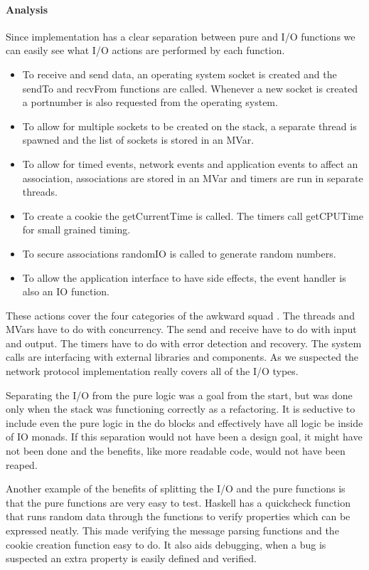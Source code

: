 \paragraph{Analysis}
Since implementation has a clear separation between pure and I/O functions we can easily see what I/O actions are performed by each function. 

\begin{itemize}
\item To receive and send data, an operating system socket is created and the sendTo and recvFrom functions are called. Whenever a new socket is created a portnumber is also requested from the operating system.
\item To allow for multiple sockets to be created on the stack, a separate thread is spawned and the list of sockets is stored in an MVar.
\item To allow for timed events, network events and application events to affect an association, associations are stored in an MVar and timers are run in separate threads.
\item To create a cookie the getCurrentTime is called. The timers call getCPUTime for small grained timing.
\item To secure associations randomIO is called to generate random numbers.
\item To allow the application interface to have side effects, the event handler is also an IO function.
\end{itemize}

These actions cover the four categories of the awkward squad \cite{jones_tackling_2009}. The threads and MVars have to do with concurrency. The send and receive have to do with input and output. The timers have to do with error detection and recovery. The system calls are interfacing with external libraries and components. As we suspected the network protocol implementation really covers all of the I/O types.

Separating the I/O from the pure logic was a goal from the start, but was done only when the stack was functioning correctly as a refactoring. It is seductive to include even the pure logic in the do blocks and effectively have all logic be inside of IO monads. If this separation would not have been a design goal, it might have not been done and the benefits, like more readable code,  would not have been reaped.

Another example of the benefits of splitting the I/O and the pure functions is that the pure functions are very easy to test. Haskell has a quickcheck\cite{Claessen_2000} function that runs random data through the functions to verify properties which can be expressed neatly. This made verifying the message parsing functions and the cookie creation function easy to do. It also aids debugging, when a bug is suspected an extra property is easily defined and verified.

